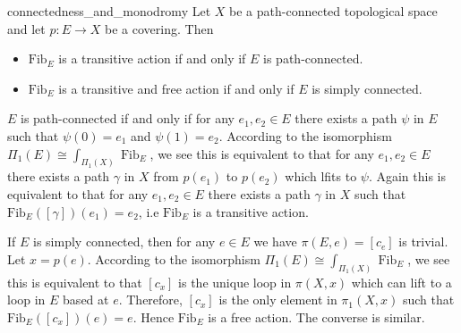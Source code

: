 \documentclass{report}
\begin{document}
\begin{proposition}{}{connectedness_and_monodromy}
	Let $X$ be a path-connected topological space and let $p:E \rightarrow X$ be a covering. Then
	\begin{itemize}
		\item $\mathrm{Fib}_E$ is a transitive action if and only if $E$ is path-connected.
		\item $\mathrm{Fib}_E$ is a transitive and free action if and only if $E$ is simply connected.
	\end{itemize}
\end{proposition}

\begin{prf}$E$ is path-connected if and only if for any $e_1,e_2\in E$ there exists a path $\psi$ in $E$ such that $\psi(0)=e_1$ and $\psi(1)=e_2$. According to the isomorphism $\Pi_1(E) \cong \int_{\Pi_1(X)} \operatorname{Fib}_E$, we see this is equivalent to that for any $e_1,e_2\in E$ there exists a path $\gamma$ in $X$ from $p(e_1)$ to $p(e_2)$ which lfits to $\psi$. Again this is equivalent to that for any $e_1,e_2\in E$ there exists a path $\gamma$ in $X$ such that $\mathrm{Fib}_E([\gamma])(e_1)=e_2$, i.e $\mathrm{Fib}_E$ is a transitive action.

	If $E$ is simply connected, then for any $e\in E$ we have $\pi(E,e)=[c_e]$ is trivial. Let $x=p(e)$. According to the isomorphism $\Pi_1(E) \cong \int_{\Pi_1(X)} \operatorname{Fib}_E$, we see this is equivalent to that $[c_x]$ is the unique loop in $\pi(X,x)$ which can lift to a loop in $E$ based at $e$. Therefore, $[c_x]$ is the only element in $\pi_1(X,x)$ such that $\mathrm{Fib}_E([c_x])(e)=e$. Hence $\mathrm{Fib}_E$ is a free action. The converse is similar.
\end{prf}
\end{document}
